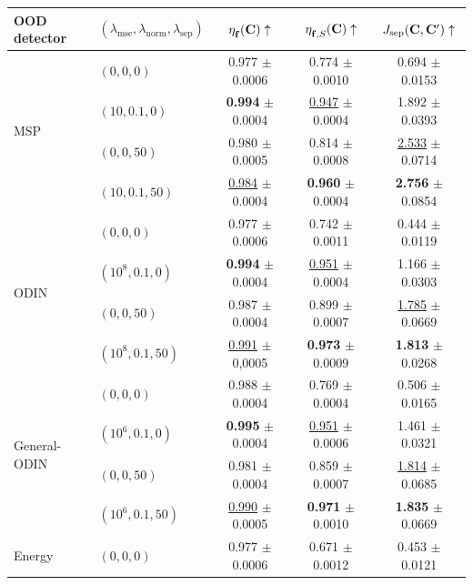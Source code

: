 \begin{table}[thb]
    \centering
    \begin{adjustbox}{width=1\columnwidth,center}
		\begin{tabular}{l|l|c|c|c}
			\toprule
			OOD detector & $(\lambda_\textrm{mse}, \lambda_\textrm{norm}, \lambda_\textrm{sep})$ &
			$\eta^{}_{\mathbf{f}}(\mathbf{C}) \uparrow$ & $\eta^{}_{\mathbf{f}, S}(\mathbf{C}) \uparrow$ & $J_{\textrm{sep}}(\mathbf{C}, \mathbf{C}') \uparrow$ \\ \hline \hline
            \multirow{4}{0.10\linewidth}{MSP} 
			& $(0, 0, 0)$ & 0.977 $\pm$ 0.0006 & 0.774 $\pm$ 0.0010 & 0.694 $\pm$ 0.0153 \\
			& $(10, 0.1, 0)$ & \textbf{0.994} $\pm$ 0.0004 & \underline{0.947} $\pm$ 0.0004 & 1.892 $\pm$ 0.0393 \\
			& $(0, 0, 50)$ & 0.980 $\pm$ 0.0005 & 0.814 $\pm$ 0.0008 & \underline{2.533} $\pm$ 0.0714 \\
			& $(10, 0.1, 50)$ & \underline{0.984} $\pm$ 0.0004 & \textbf{0.960} $\pm$ 0.0004 & \textbf{2.756} $\pm$ 0.0854 \\ \hline
            \multirow{4}{0.10\linewidth}{ODIN} 
			& $(0, 0, 0)$ & 0.977 $\pm$ 0.0006 & 0.742 $\pm$ 0.0011 & 0.444 $\pm$ 0.0119 \\
			& $(10^8, 0.1, 0)$ & \textbf{0.994} $\pm$ 0.0004 & \underline{0.951} $\pm$ 0.0004 & 1.166 $\pm$ 0.0303 \\
			& $(0, 0, 50)$ & 0.987 $\pm$ 0.0004 & 0.899 $\pm$ 0.0007 & \underline{1.785} $\pm$ 0.0669 \\
			& $(10^8, 0.1, 50)$ & \underline{0.991} $\pm$ 0,0005 & \textbf{0.973} $\pm$ 0.0009 & \textbf{1.813} $\pm$ 0.0268 \\ \hline
            \multirow{4}{0.10\linewidth}{General-ODIN} 
			& $(0, 0, 0)$ & 0.988 $\pm$ 0.0004 & 0.769 $\pm$ 0.0004 & 0.506 $\pm$ 0.0165 \\
			& $(10^6, 0.1, 0)$ & \textbf{0.995} $\pm$ 0.0004 & \underline{0.951} $\pm$ 0.0006 & 1.461 $\pm$ 0.0321 \\
			& $(0, 0, 50)$ & 0.981 $\pm$ 0.0004 & 0.859 $\pm$ 0.0007 & \underline{1.814} $\pm$ 0.0685 \\
			& $(10^6, 0.1, 50)$ & \underline{0.990} $\pm$ 0.0005 & \textbf{0.971} $\pm$ 0.0010 & \textbf{1.835} $\pm$ 0.0669 \\ \hline
            \multirow{4}{0.10\linewidth}{Energy} 
			& $(0, 0, 0)$ & 0.977 $\pm$ 0.0006 & 0.671 $\pm$ 0.0012 & 0.453 $\pm$ 0.0121 \\

\end{tabular}
\end{adjustbox}
\end{table}
